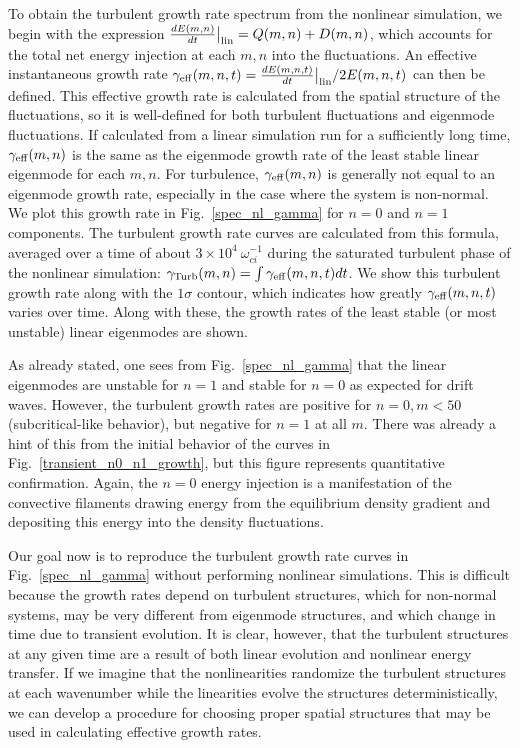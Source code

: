 \documentclass[letter,scriptaddress,twocolumn, prl,showkeys]{revtex4}
\newcommand{\diff}[2]{\frac{d#1}{d#2}}
\begin{document}
To obtain the turbulent growth rate spectrum from the nonlinear simulation, we begin with the expression $\diff{E(m,n)}{t}\big|_{\rm{lin}} = Q(m,n) + D(m,n)$, 
which accounts for the total net energy injection at each $m,n$ into the fluctuations. 
An effective instantaneous growth rate $\gamma_{\rm{eff}}(m,n,t) = \diff{E(m,n,t)}{t}\big|_{\rm{lin}}/ 2 E(m,n,t)$ can then be defined. 
This effective growth rate is calculated from the spatial structure of the fluctuations, so it is well-defined for both turbulent fluctuations and eigenmode fluctuations. If calculated
from a linear simulation run for a sufficiently long time, $\gamma_{\rm{eff}}(m,n)$ is the same as the eigenmode growth rate of the least stable linear eigenmode for each $m,n$.
For turbulence, $\gamma_{\rm{eff}}(m,n)$ is generally not equal to an eigenmode growth rate, especially in the case where the system is non-normal.
We plot this growth rate in Fig.~\ref{spec_nl_gamma} for $n=0$ and $n=1$ components. The turbulent growth rate curves are calculated from this formula, 
averaged over a time of about $3 \times 10^{4} \ \omega_{ci}^{-1}$ during the saturated turbulent phase of the nonlinear simulation: $\gamma_{\rm{Turb}}(m,n) = \int \gamma_{\rm{eff}}(m,n,t) dt$. 
We show this turbulent growth rate along with the $1 \sigma$ contour, which indicates how greatly $\gamma_{\rm{eff}}(m,n,t)$ varies over time.
Along with these, the growth rates of the least stable (or most unstable) linear eigenmodes are shown.

As already stated, one sees from Fig.~\ref{spec_nl_gamma} that the linear eigenmodes are unstable for $n=1$ and stable for $n=0$ as expected for drift waves. 
However, the turbulent growth rates are positive for $n=0, m<50$ (subcritical-like behavior), but negative for $n=1$ at all $m$. 
There was already a hint of this from the initial behavior of the
curves in Fig.~\ref{transient_n0_n1_growth}, but this figure represents
quantitative confirmation.
Again, the $n=0$ energy injection is a manifestation of the convective filaments drawing energy from the equilibrium density gradient and depositing this energy into the density fluctuations.

Our goal now is to reproduce the turbulent growth rate curves in Fig.~\ref{spec_nl_gamma} without performing nonlinear simulations. This is difficult because the growth rates depend on turbulent
structures, which for non-normal systems, may be very different from eigenmode structures, and which change in time due to transient evolution.
It is clear, however, that the turbulent structures at any given time are a result of both linear evolution and nonlinear energy transfer. 
If we imagine that the nonlinearities randomize the turbulent structures at each wavenumber while the linearities evolve the structures
deterministically, we can develop a procedure for choosing proper spatial structures that may be used in calculating effective growth rates.
\end{document}
